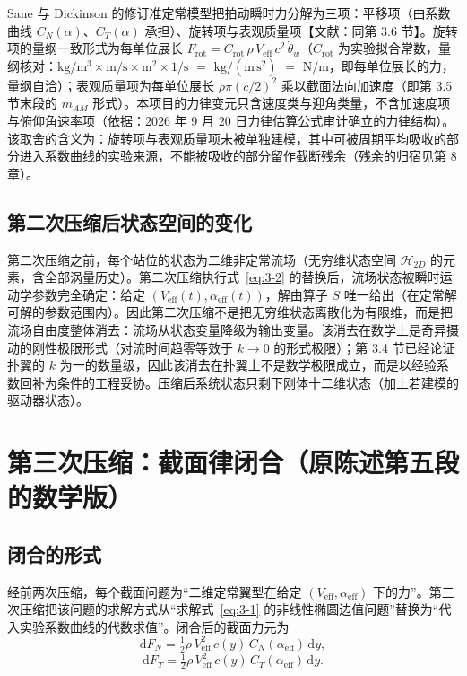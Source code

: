 \documentclass[11pt,a4paper]{ctexart}
\numberwithin{equation}{section}
\begin{document}
Sane 与 Dickinson 的修订准定常模型把拍动瞬时力分解为三项：平移项（由系数曲线 $C_N(\alpha)$、$C_T(\alpha)$ 承担）、旋转项与表观质量项【文献：同第 3.6 节】。旋转项的量纲一致形式为每单位展长 $F_{\text{rot}} = C_{\text{rot}}\,\rho\, V_{\text{eff}}\, c^2\,\dot{\theta}_w$（$C_{\text{rot}}$ 为实验拟合常数，量纲核对：$\mathrm{kg/m^3 \times m/s \times m^2 \times 1/s}$ $=$ $\mathrm{kg/(m\,s^2)}$ $=$ $\mathrm{N/m}$，即每单位展长的力，量纲自洽）；表观质量项为每单位展长 $\rho\pi (c/2)^2$ 乘以截面法向加速度（即第 3.5 节末段的 $m_{AM}$ 形式）。本项目的力律变元只含速度类与迎角类量，不含加速度项与俯仰角速率项（依据：2026 年 9 月 20 日力律估算公式审计确立的力律结构）。该取舍的含义为：旋转项与表观质量项未被单独建模，其中可被周期平均吸收的部分进入系数曲线的实验来源，不能被吸收的部分留作截断残余（残余的归宿见第 8 章）。

\subsection{第二次压缩后状态空间的变化}

第二次压缩之前，每个站位的状态为二维非定常流场（无穷维状态空间 $\mathcal{H}_{2D}$ 的元素，含全部涡量历史）。第二次压缩执行式~\eqref{eq:3-2} 的替换后，流场状态被瞬时运动学参数完全确定：给定 $(V_{\text{eff}}(t), \alpha_{\text{eff}}(t))$，解由算子 $S$ 唯一给出（在定常解可解的参数范围内）。因此第二次压缩不是把无穷维状态离散化为有限维，而是把流场自由度整体消去：流场从状态变量降级为输出变量。该消去在数学上是奇异摄动的刚性极限形式（对流时间趋零等效于 $k \to 0$ 的形式极限）；第 3.4 节已经论证扑翼的 $k$ 为一的数量级，因此该消去在扑翼上不是数学极限成立，而是以经验系数回补为条件的工程妥协。压缩后系统状态只剩下刚体十二维状态（加上若建模的驱动器状态）。

\section{第三次压缩：截面律闭合（原陈述第五段的数学版）}\label{sec:closure}

\subsection{闭合的形式}

经前两次压缩，每个截面问题为“二维定常翼型在给定 $(V_{\text{eff}}, \alpha_{\text{eff}})$ 下的力”。第三次压缩把该问题的求解方式从“求解式~\eqref{eq:3-1} 的非线性椭圆边值问题”替换为“代入实验系数曲线的代数求值”。闭合后的截面力元为
\begin{equation}
  \mathrm{d}F_N = \tfrac{1}{2}\rho\, V_{\text{eff}}^2\, c(y)\, C_N(\alpha_{\text{eff}})\,\mathrm{d}y, \label{eq:4-1}
\end{equation}
\begin{equation}
  \mathrm{d}F_T = \tfrac{1}{2}\rho\, V_{\text{eff}}^2\, c(y)\, C_T(\alpha_{\text{eff}})\,\mathrm{d}y. \label{eq:4-2}
\end{equation}
\end{document}
